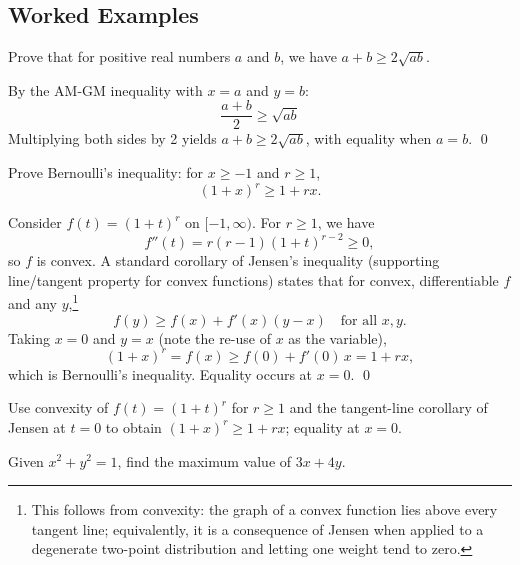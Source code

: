\documentclass[12pt]{article}
\begin{document}
\subsection{Worked Examples}

\begin{examplebox}[title={\bfseries Example~\thetcbcounter: Basic AM-GM Application}]
Prove that for positive real numbers $a$ and $b$, we have $a + b \ge 2\sqrt{ab}$.

\end{examplebox}

\begin{solution}
By the AM-GM inequality with $x = a$ and $y = b$:
\[
\frac{a + b}{2} \ge \sqrt{ab}
\]
Multiplying both sides by 2 yields $a + b \ge 2\sqrt{ab}$, with equality when $a = b$. \qed
\end{solution}

\begin{examplebox}[title={\bfseries Example~\thetcbcounter: Bernoulli's Inequality via Jensen}]
Prove Bernoulli's inequality: for $x\ge -1$ and $r\ge 1$,
\[
  (1+x)^r \ge 1 + r x.
\]

\end{examplebox}

\begin{solution}
Consider $f(t) = (1+t)^r$ on $[-1,\infty)$. For $r\ge 1$, we have
\[
  f''(t) = r(r-1)(1+t)^{r-2} \ge 0,
\]
so $f$ is convex. A standard corollary of Jensen's inequality (supporting line/tangent property for convex functions) states that for convex, differentiable $f$ and any $y$,\footnote{This follows from convexity: the graph of a convex function lies above every tangent line; equivalently, it is a consequence of Jensen when applied to a degenerate two-point distribution and letting one weight tend to zero.}
\[
  f(y) \ge f(x) + f'(x)(y-x) \quad \text{for all }x,y.
\]
Taking $x=0$ and $y=x$ (note the re-use of $x$ as the variable),
\[
  (1+x)^r = f(x) \ge f(0) + f'(0)\,x = 1 + r x,
\]
which is Bernoulli's inequality. Equality occurs at $x=0$. \qed
\end{solution}

\begin{takeaways}
  \item Use convexity of $f(t)=(1+t)^r$ for $r\ge 1$ and the tangent-line corollary of Jensen at $t=0$ to obtain $(1+x)^r\ge 1+rx$; equality at $x=0$.
\end{takeaways}

\begin{examplebox}[title={\bfseries Example~\thetcbcounter: Cauchy-Schwarz with Constraint}]
Given $x^2 + y^2 = 1$, find the maximum value of $3x + 4y$.

\end{examplebox}
\end{document}
